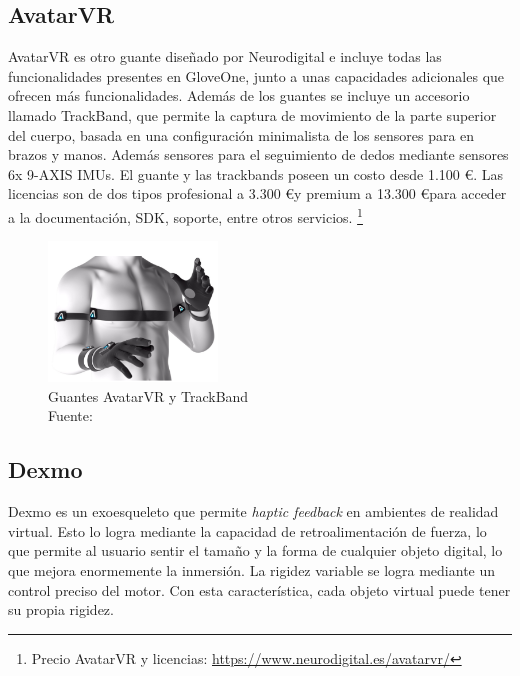 
    
\subsection{AvatarVR}
    	AvatarVR es otro guante diseñado por Neurodigital e incluye todas las funcionalidades presentes en GloveOne, junto a unas capacidades adicionales que ofrecen más funcionalidades. Además de los guantes se incluye un accesorio llamado TrackBand, que permite la captura de movimiento de la parte superior del cuerpo, basada en una configuración minimalista de los sensores  para en brazos y manos. Además sensores para el seguimiento de dedos mediante sensores 6x 9-AXIS IMUs. El guante y las trackbands poseen un costo desde 1.100 \euro \space.  Las licencias son de dos tipos profesional a 3.300 \euro \space y premium  a 13.300 \euro  \space para acceder a la documentación, SDK, soporte, entre otros servicios. 
	\footnote{Precio AvatarVR y licencias: \url{https://www.neurodigital.es/avatarvr/}}
        
\begin{figure}[H]
  \begin{center} 
   	\includegraphics[width=0.4\textwidth]{images/chapter02/avatar-VR.png} 
     \caption[Guantes AvatarVR y TrackBand]{Guantes AvatarVR y TrackBand \\Fuente: \cite{avatarvr-info-page}} 
    \label{fig:avatarVR}
  \end{center}
\end{figure}

        
\subsection{Dexmo} 
    Dexmo es un exoesqueleto que permite \textit{haptic feedback} en ambientes de realidad virtual. Esto lo logra mediante la capacidad de retroalimentación de fuerza, lo que permite al usuario sentir el tamaño y la forma de cualquier objeto digital, lo que mejora enormemente la inmersión. La rigidez variable se logra mediante un control preciso del motor. Con esta característica, cada objeto virtual puede tener su propia rigidez.
    

